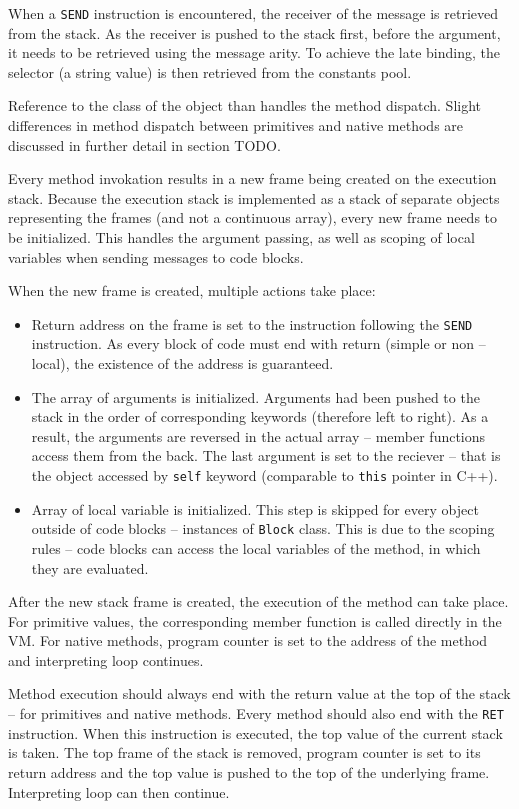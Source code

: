 \documentclass[thesis=M,english]{FITthesis}[2019/12/23]
\begin{document}
When a \texttt{SEND} instruction is encountered, the receiver of the message is retrieved from the stack. As the receiver is pushed to the stack
first, before the argument, it needs to be retrieved using the message arity. To achieve the late binding, the selector (a string value)
is then retrieved from the constants pool. 

Reference to the class of the object than handles the method dispatch. Slight differences in method dispatch between primitives and native
methods are discussed in further detail in section TODO.

Every method invokation results in a new frame being created on the execution stack. Because the execution stack is implemented as a
stack of separate objects representing the frames (and not a continuous array), every new frame needs to be initialized. This handles
the argument passing, as well as scoping of local variables when sending messages to code blocks.

When the new frame is created, multiple actions take place:
\begin{itemize}
	\item Return address on the frame is set to the instruction following the \texttt{SEND} instruction. As every block of code must end
		with return (simple or non -- local), the existence of the address is guaranteed.
	\item The array of arguments is initialized. Arguments had been pushed to the stack in the order of corresponding keywords (therefore
		left to right). As a result, the arguments are reversed in the actual array -- member functions access them from the back. The
		last argument is set to the reciever -- that is the object accessed by \texttt{self} keyword (comparable to \texttt{this} pointer in
		C++).
	\item Array of local variable is initialized. This step is skipped for every object outside of code blocks -- instances of \texttt{Block}
		class. This is due to the scoping rules -- code blocks can access the local variables of the method, in which they are evaluated.
\end{itemize}

After the new stack frame is created, the execution of the method can take place. For primitive values, the corresponding member function
is called directly in the VM. For native methods, program counter is set to the address of the method and interpreting loop continues.

Method execution should always end with the return value at the top of the stack -- for primitives and native methods. Every method
should also end with the \texttt{RET} instruction. When this instruction is executed, the top value of the current stack is taken.
The top frame of the stack is removed, program counter is set to its return address and the top value is pushed to the top of the
underlying frame. Interpreting loop can then continue.
\end{document}
